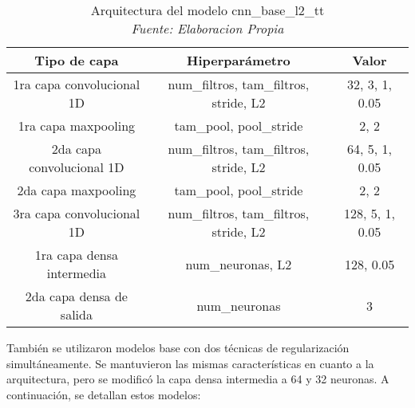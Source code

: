 \begin{itemize}
	\begin{table}[!ht]
		\centering
		\begin{tabular}{|c|c|c|}
			\hline
			\textbf{Tipo de capa} & \textbf{Hiperparámetro} & \textbf{Valor} \\ \hline
			1ra capa convolucional 1D & num\_filtros, tam\_filtros, stride, L2 & 32, 3, 1, 0.05 \\ \hline
			1ra capa maxpooling & tam\_pool, pool\_stride & 2, 2 \\ \hline
			2da capa convolucional 1D & num\_filtros, tam\_filtros, stride, L2 & 64, 5, 1, 0.05 \\ \hline
			2da capa maxpooling & tam\_pool, pool\_stride & 2, 2 \\ \hline
			3ra capa convolucional 1D & num\_filtros, tam\_filtros, stride, L2 & 128, 5, 1, 0.05 \\ \hline
			1ra capa densa intermedia & num\_neuronas, L2 & 128, 0.05 \\ \hline
			2da capa densa de salida & num\_neuronas & 3 \\ \hline
		\end{tabular}
		\caption{Arquitectura del modelo cnn\_base\_l2\_tt
			\\\textit{Fuente: Elaboracion Propia}}
		\label{tbl:cnn_base_l2_tt}
	\end{table}
	
	
\end{itemize}

También se utilizaron modelos base con dos técnicas de regularización simultáneamente. Se mantuvieron las mismas características en cuanto a la arquitectura, pero se modificó la capa densa intermedia a 64 y 32 neuronas. A continuación, se detallan estos modelos:

